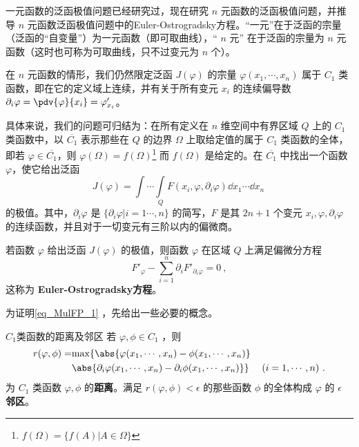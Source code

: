 一元函数的泛函极值问题已经研究过，现在研究 $n$ 元函数的泛函极值问题，并推导 $n$ 元函数泛函极值问题中的Euler-Ostrogradsky方程。“一元”在于泛函的宗量（泛函的“自变量”）为一元函数（即可取曲线），“ $n$ 元” 在于泛函的宗量为 $n$ 元函数（这时也可称为可取曲线，只不过变元为 $n$ 个）。

在 $n$ 元函数的情形，我们仍然限定泛函 $J(\varphi)$ 的宗量 $\varphi(x_1,\cdots,x_n)$ 属于 $C_1$ 类函数，即在它的定义域上连续，并有关于所有变元 $x_i$ 的连续偏导数 $\partial_i\varphi=\pdv{\varphi}{x_i}=\varphi'_{x_i}$。

具体来说，我们的问题可归结为：在所有定义在 $n$ 维空间中有界区域 $Q$ 上的 $C_1$ 类函数中，以 $\overline{C_1}$ 表示那些在 $Q$ 的边界 $\Omega$ 上取给定值的属于 $C_1$ 类函数的全体，即若 $\varphi\in\overline{C_1}$，则 $\varphi(\Omega)=f(\Omega)$\footnote{$f(\Omega)=\{f(A)|A\in \Omega\}$} 而 $f(\Omega)$ 是给定的。在 $\overline{C_1}$ 中找出一个函数 $\varphi$，使它给出泛函
\begin{equation}
J(\varphi)=\int\cdots\int\limits_Q F(x_i,\varphi,\partial_i\varphi)\dd x_1\cdots\dd x_n~
\end{equation}
的极值。其中，$\partial_i\varphi$ 是 $\{\partial_i\varphi|i=1\cdots,n\}$ 的简写，$F$ 是其 $2n+1$ 个变元 $x_i,\varphi,\partial_i\varphi$ 的连续函数，并且对于一切变元有三阶以内的偏微商。

若函数 $\varphi$ 给出泛函 $J(\varphi)$ 的极值，则函数 $\varphi$ 在区域 $Q$ 上满足偏微分方程
\begin{equation}\label{eq_MulFP_1}
F'_\varphi-\sum_{i=1}^n\partial_i F'_{\partial_i\varphi}=0~,
\end{equation}
这称为 \textbf{Euler-Ostrogradsky方程}。

为证明\autoref{eq_MulFP_1} ，先给出一些必要的概念。
\begin{definition}{$C_1$类函数的距离及邻区}
若 $\varphi,\phi\in C_1$ ，则
\begin{equation}
\begin{aligned}
r(\varphi,\phi)=&\mathrm{max}\{\abs{\varphi(x_1,\cdots,x_n)-\phi(x_1,\cdots,x_n)}\\
&\abs{\partial_i\varphi(x_1,\cdots,x_n)-\partial_i\phi(x_1,\cdots,x_n)}\}~\quad (i=1,\cdots,n)~.
\end{aligned}
\end{equation}
为 $C_1$ 类函数 $\varphi,\phi$ 的\textbf{距离}。满足 $r(\varphi,\phi)<\epsilon$ 的那些函数 $\phi$ 的全体构成 $\varphi$ 的 $\epsilon$ \textbf{邻区}。 
\end{definition}
